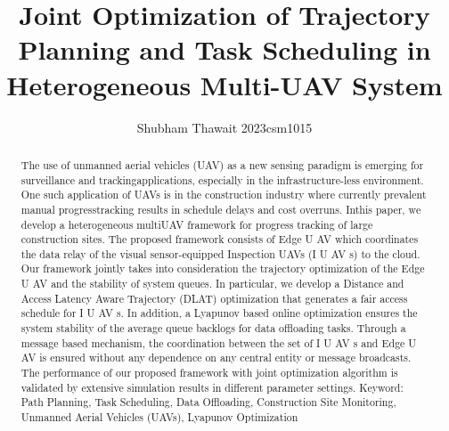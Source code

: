 \documentclass{article}
\title{Joint Optimization of Trajectory Planning and Task Scheduling in
Heterogeneous Multi-UAV System}
\author{Shubham Thawait 2023csm1015}
\date{}
\begin{document}
\maketitle
\begin{multicols}{2}
\begin{abstract}
    The use of unmanned aerial vehicles (UAV) as a new sensing paradigm is emerging for surveillance and trackingapplications, especially in the infrastructure-less environment. One such application of UAVs is in the construction industry where currently prevalent manual progresstracking results in schedule delays and cost overruns. Inthis paper, we develop a heterogeneous multiUAV framework for progress tracking of large construction sites. The
proposed framework consists of Edge U AV which coordinates the data relay of the visual sensor-equipped Inspection UAVs (I U AV s) to the cloud. Our framework jointly takes into consideration the trajectory optimization of the Edge U AV and the stability of system queues. In particular, we develop a Distance and Access Latency Aware
Trajectory (DLAT) optimization that generates a fair access schedule for I U AV s. In addition, a Lyapunov based
online optimization ensures the system stability of the average queue backlogs for data offloading tasks. Through a
message based mechanism, the coordination between the
set of I U AV s and Edge U AV is ensured without any
dependence on any central entity or message broadcasts.
The performance of our proposed framework with joint
optimization algorithm is validated by extensive simulation results in different parameter settings.
Keyword: Path Planning, Task Scheduling, Data Offloading, Construction Site Monitoring, Unmanned Aerial
Vehicles (UAVs), Lyapunov Optimization
\end{abstract}


\end{multicols}
\end{document}
